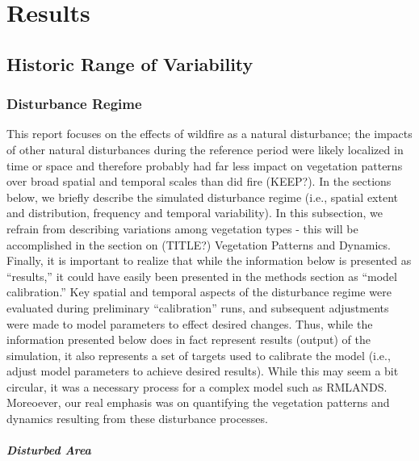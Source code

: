 \chapter{Results}

\section{Historic Range of Variability}

\subsection{Disturbance Regime}

This report focuses on the effects of wildfire as a natural disturbance; the impacts of other natural disturbances during the reference period were likely localized in time or space and therefore probably had far less impact on vegetation patterns over broad spatial and temporal scales than did fire (KEEP?). In the sections below, we briefly describe the simulated disturbance regime (i.e., spatial extent and distribution, frequency and temporal variability). In this subsection, we refrain from describing variations among vegetation types - this will be accomplished in the section on (TITLE?) Vegetation Patterns and Dynamics. Finally, it is important to realize that while the information below is presented as ``results,'' it could have easily been presented in the methods section as ``model calibration.'' Key spatial and temporal aspects of the disturbance regime were evaluated during preliminary ``calibration'' runs, and subsequent adjustments were made to model parameters to effect desired changes. Thus, while the information presented below does in fact represent results (output) of the simulation, it also represents a set of targets used to calibrate the model (i.e., adjust model parameters to achieve desired results). While this may seem a bit circular, it was a necessary process for a complex model such as RMLANDS. Moreoever, our real emphasis was on quantifying the vegetation patterns and dynamics resulting from these disturbance processes.

\paragraph{Disturbed Area}

